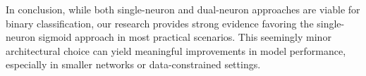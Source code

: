 In conclusion, while both single-neuron and dual-neuron approaches are viable for binary classification, our research provides strong evidence favoring the single-neuron sigmoid approach in most practical scenarios. This seemingly minor architectural choice can yield meaningful improvements in model performance, especially in smaller networks or data-constrained settings.
